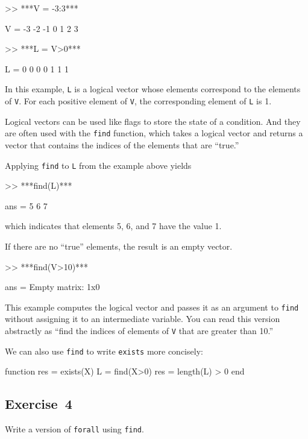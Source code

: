 
\begin{code}
>> ***V = -3:3***

V = -3    -2    -1     0     1     2     3

>> ***L = V>0***

L =  0     0     0     0     1     1     1
\end{code}

In this example, \lstinline{L} is a logical vector whose elements
correspond to the elements of \lstinline{V}.  For each positive element of
\lstinline{V}, the corresponding element of \lstinline{L} is 1.

Logical vectors can be used like flags to store the state of
a condition.  And they are often used with the \lstinline{find} function,
which takes a logical vector and returns a vector that contains
the indices of the elements that are ``true.''


Applying \lstinline{find} to \lstinline{L} from the example above yields

\begin{code}
>> ***find(L)***

ans = 5     6     7
\end{code}
which indicates that elements 5, 6, and 7 have the value 1.

If there are no ``true'' elements, the result is an empty vector.

\begin{code}
>> ***find(V>10)***

ans = Empty matrix: 1x0
\end{code}

This example computes the logical vector and passes it as an
argument to \lstinline{find} without assigning it to an intermediate
variable.  You can read this version abstractly as ``find
the indices of elements of \lstinline{V} that are greater than 10.''

We can also use \lstinline{find} to write \lstinline{exists} more concisely:

\begin{code}
function res = exists(X)
    L = find(X>0)
    res = length(L) > 0
end
\end{code}

\subsection{Exercise~4}
Write a version of \lstinline{forall} using \lstinline{find}.


